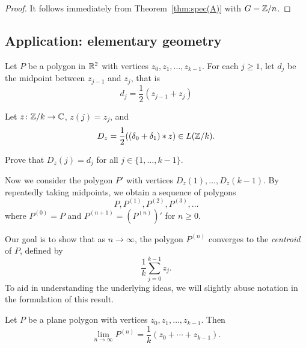 \begin{proof}
    It follows immediately from Theorem~\ref{thm:spec(A)} with $G=\mathbb{Z}/n$.    
\end{proof}

\subsection{Application: elementary geometry}

Let $P$ be a polygon in $\mathbb{R}^2$ with vertices 
$z_0,z_1,\dots,z_{k-1}$. For each 
$j\geq1$, let $d_j$ be the midpoint between $z_{j-1}$ and $z_j$, that is 
  \[
	d_j=\frac12(z_{j-1}+z_j)
  \]

Let $z\colon\mathbb{Z}/k\to\mathbb{C}$, $z(j)=z_j$, and 
  \[
    D_z=\frac12((\delta_0+\delta_1)*z)\in L(\mathbb{Z}/k). 
  \]
  
\begin{exercise}
\label{xca:D_z}
    Prove that $D_z(j)=d_j$ for all $j\in\{1,\dots,k-1\}$.
\end{exercise}

Now we consider the polygon $P'$ with vertices 
  $D_z(1),\dots,D_z(k-1)$. By repeatedly taking midpoints, 
  we obtain a sequence of polygons 
  \[
  P,P^{(1)},P^{(2)},P^{(3)},\dots
  \]
  where 
  $P^{(0)}=P$ and 
  $P^{(n+1)}=(P^{(n)})'$ for $n\geq0$.

    Our goal is to show that as $n \to \infty$, the polygon $P^{(n)}$ converges to the \emph{centroid} of $P$, 
    defined by
  \[
	\frac{1}{k}\sum_{j=0}^{k-1}z_j.
  \]
  To aid in understanding the underlying ideas, we will slightly abuse notation
  in the formulation of this result.
  
  \begin{theorem}
	Let $P$ be a plane polygon with vertices $z_0,z_1,\dots,z_{k-1}$. Then 
   	\[
	  \lim_{n\to\infty}P^{(n)}=\frac{1}{k}(z_0+\cdots+z_{k-1}).
	\]
  \end{theorem}

